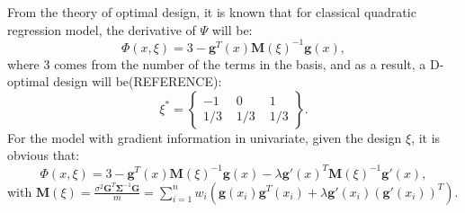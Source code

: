 \documentclass[preprint,12pt]{elsarticle}
\begin{document}
From the theory of optimal design, it is known that for classical
quadratic regression model, the derivative of $\Psi$ will be:
$$\Phi(x,\xi)=3-\boldsymbol{g}^T(x)\boldsymbol{M}(\xi)^{-1}\boldsymbol{g}(x),$$
where $3$ comes from the number of the terms in the basis, and as a
result, a D-optimal design will be(REFERENCE):
$$\xi^*=\left\{\begin{array}{lll}-1\,\,&0\,\,&1\\1/3\,\,&1/3\,\,&1/3\end{array}\right\}.$$
For the model with gradient information in univariate, given the
design $\xi$, it is obvious that:
$$\Phi(x,\xi)=3-\boldsymbol{g}^T(x)\boldsymbol{M}(\xi)^{-1}\boldsymbol{g}(x)-\lambda\boldsymbol{g}'(x)^T\boldsymbol{M}(\xi)^{-1}\boldsymbol{g}'(x),$$
with
$\boldsymbol{M}(\xi)=\frac{\sigma^2\boldsymbol{G}^T\boldsymbol{\Sigma}^{-1}\boldsymbol{G}}{m}=\sum\limits_{i=1}^nw_i\left(\boldsymbol{g}(x_i)\boldsymbol{g}^T(x_i)+\lambda\boldsymbol{g}'(x_i)
\left(\boldsymbol{g}'(x_i)\right)^T\right).$
\end{document}
